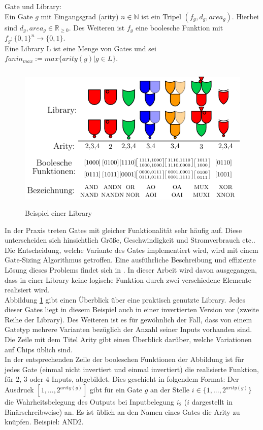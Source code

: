 \documentclass[11pt, a4paper, german]{article}
\begin{document}
\begin{definition}{Gate und Library:}\label{def:gate}\\
Ein Gate $g$ mit Eingangsgrad (arity) $ n \in \mathbb{N}$ ist ein Tripel $(f_g, d_g, area_g)$. Hierbei sind $d_g, area_g \in \mathbb{R}_{\geq 0}$. Des Weiteren ist $f_g$ eine boolesche Funktion mit $ f_g : \{0,1\}^n \rightarrow \{0, 1\} $. \\
Eine Library L ist eine Menge von Gates und sei \\ 
$fanin_{max} := max\{ arity(g) | g \in L \}$.
\end{definition}
\begin{figure}[h]
\begin{center}
 \includegraphics[height = 200pt]{./pictures/compiled/new_library}
 \caption{Beispiel einer Library}
 \label{bild:new_library}
\end{center}
\end{figure}
In der Praxis treten Gates mit gleicher Funktionalit\"at sehr h\"aufig auf. Diese unterscheiden sich hinsichtlich Gr\"o{\ss}e, Geschwindigkeit und Stromverbrauch etc.. Die Entscheidung, welche Variante des Gates implementiert wird, wird mit einem Gate-Sizing Algorithmus getroffen. Eine ausf\"uhrliche Beschreibung und effiziente L\"osung dieses Problems findet sich in \cite{GateSizing}. In dieser Arbeit wird davon ausgegangen, dass in einer Library keine logische Funktion durch zwei verschiedene Elemente realisiert wird.\\
Abbildung \ref{bild:new_library} gibt einen Überblick über eine praktisch genutzte Library. Jedes dieser Gates liegt in diesem Beispiel auch in einer invertierten Version vor (zweite Reihe der Library). Des Weiteren ist es für gewöhnlich der Fall, dass von einem Gatetyp mehrere Varianten bezüglich der Anzahl seiner Inputs vorhanden sind. Die Zeile mit dem Titel Arity gibt einen Überblick darüber, welche Variationen auf Chips üblich sind.\\
In der entsprechenden Zeile der booleschen Funktionen der Abbildung ist für jedes Gate (einmal nicht invertiert und einmal invertiert) die realisierte  Funktion, für 2, 3 oder 4 Inputs, abgebildet. Dies geschieht in folgendem Format: Der Ausdruck $[1,...,2^{arity(g)} ]$ gibt für ein Gate $g$ an der Stelle $i \in \{1,...,2^{arity(g)}\}$ die Wahrheitsbelegung des Outputs bei Inputbelegung $i_2$ ($i$ dargestellt in Binärschreibweise) an. Es ist üblich an den Namen eines Gates die Arity zu knüpfen. Beispiel: AND2. \\
\end{document}
